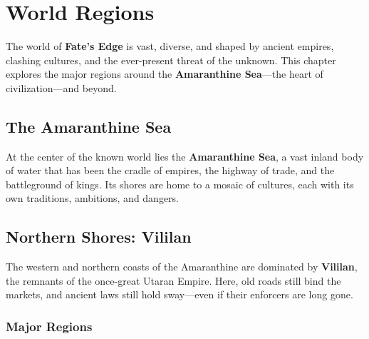 
\chapter{World Regions}

The world of \textbf{Fate’s Edge} is vast, diverse, and shaped by ancient empires, clashing cultures, and the ever-present threat of the unknown. This chapter explores the major regions around the \textbf{Amaranthine Sea}—the heart of civilization—and beyond.

\section{The Amaranthine Sea}

At the center of the known world lies the \textbf{Amaranthine Sea}, a vast inland body of water that has been the cradle of empires, the highway of trade, and the battleground of kings. Its shores are home to a mosaic of cultures, each with its own traditions, ambitions, and dangers.

\section{Northern Shores: Vililan}

The western and northern coasts of the Amaranthine are dominated by \textbf{Vililan}, the remnants of the once-great Utaran Empire. Here, old roads still bind the markets, and ancient laws still hold sway—even if their enforcers are long gone.

\subsection*{Major Regions}

